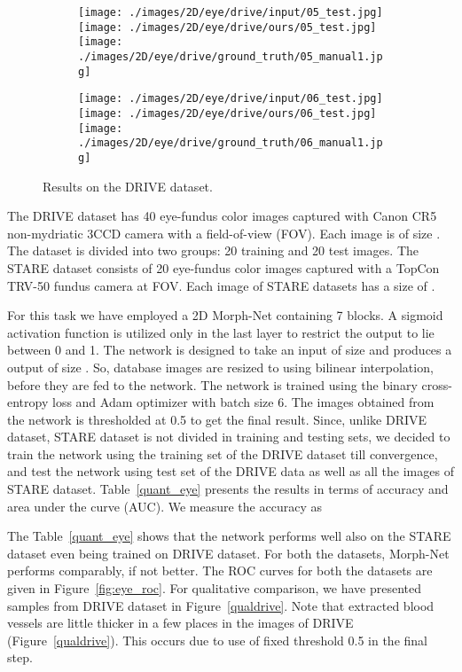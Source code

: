 \documentclass[12pt]{article}
\def\Figref#1{Figure~\ref{#1}}
\begin{document}
\begin{figure*}[h]
\begin{subfigure}[t]{0.22\linewidth}
\caption{}
\end{subfigure}
\begin{subfigure}[t]{0.22\linewidth}
\texttt{[image: ./images/2D/eye/drive/input/05\_test.jpg]}
\texttt{[image: ./images/2D/eye/drive/ours/05\_test.jpg]}
\texttt{[image: ./images/2D/eye/drive/ground\_truth/05\_manual1.jpg]}
\caption{}
\end{subfigure}
\begin{subfigure}[t]{0.22\linewidth}
\texttt{[image: ./images/2D/eye/drive/input/06\_test.jpg]}
\texttt{[image: ./images/2D/eye/drive/ours/06\_test.jpg]}
\texttt{[image: ./images/2D/eye/drive/ground\_truth/06\_manual1.jpg]}
\caption{}
\end{subfigure}
\caption{Results on the DRIVE dataset.}
\label{fig:failure_cases_drive}
\end{figure*}

The DRIVE dataset has 40 eye-fundus color images captured with Canon CR5 non-mydriatic 3CCD camera with a  field-of-view (FOV). Each image is of size . The dataset is divided into two groups: 20 training and 20 test images. The STARE dataset consists of 20 eye-fundus color images captured with a TopCon TRV-50 fundus camera at  FOV. Each image of STARE datasets has a size of . 

For this task we have employed a 2D Morph-Net containing 7  blocks. 
A sigmoid activation function is utilized only in the last layer to restrict the output to lie between 0 and 1. 
The network is designed to take an input of size  and produces a output of size . So, database images are resized to  using bilinear interpolation, before they are fed to the network. The network is trained using the binary cross-entropy loss and Adam optimizer \cite{kingma_adam:_2014} with batch size 6. The images obtained from the network is thresholded at 0.5 to get the final result. Since, unlike DRIVE dataset, STARE dataset is not divided in training and testing sets, we decided to train the network using the training set of the DRIVE dataset till convergence, and test the network using test set of the DRIVE data as well as all the images of STARE dataset.
Table~\ref{quant_eye} presents the results in terms of accuracy and area under the curve (AUC). We measure the accuracy as 

The Table~\ref{quant_eye} shows that the network performs well also on the STARE dataset even being trained on DRIVE dataset. For both the datasets, Morph-Net performs comparably, if not better. The ROC curves for both the datasets are given in Figure~\ref{fig:eye_roc}. For qualitative comparison, we have presented samples from DRIVE dataset in Figure~\ref{qualdrive}. Note that extracted blood vessels are little thicker in a few places in the images of DRIVE (\Figref{qualdrive}). 
This occurs due to use of fixed threshold 0.5 in the final step.
\end{document}
